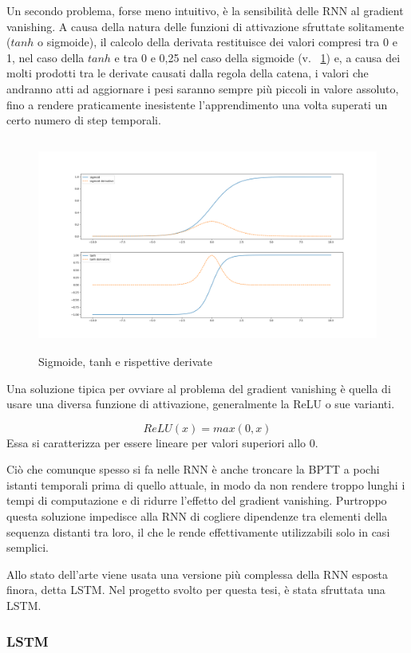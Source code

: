 Un secondo problema, forse meno intuitivo, è la sensibilità delle RNN al gradient vanishing. A causa della natura delle funzioni di attivazione sfruttate solitamente ($tanh$ o sigmoide), il calcolo della derivata restituisce dei valori compresi tra 0 e 1, nel caso della $tanh$ e tra 0 e 0,25 nel caso della sigmoide (v. \figurename~\ref{fig:sigm_tanh}) e, a causa dei molti prodotti tra le derivate causati dalla regola della catena, i valori che andranno atti ad aggiornare i pesi saranno sempre più piccoli in valore assoluto, fino a rendere praticamente inesistente l'apprendimento una volta superati un certo numero di step temporali.

\begin{figure}
    \centering
    \includegraphics[height=7cm]{pictures/sigm_tanh_deriv.png}
    \caption{Sigmoide, tanh e rispettive derivate}
    \label{fig:sigm_tanh}
\end{figure}

Una soluzione tipica per ovviare al problema del gradient vanishing è quella di usare una diversa funzione di attivazione, generalmente la ReLU o sue varianti.

\begin{equation*}
    ReLU(x) = max(0,x)
\end{equation*}
Essa si caratterizza per essere lineare per valori superiori allo 0.

Ciò che comunque spesso si fa nelle RNN è anche troncare la BPTT a pochi istanti temporali prima di quello attuale, in modo da non rendere troppo lunghi i tempi di computazione e di ridurre l'effetto del gradient vanishing. Purtroppo questa soluzione impedisce alla RNN di cogliere dipendenze tra elementi della sequenza distanti tra loro, il che le rende effettivamente utilizzabili solo in casi semplici.

Allo stato dell'arte viene usata una versione più complessa della RNN esposta finora, detta LSTM. Nel progetto svolto per questa tesi, è stata sfruttata una LSTM.

\subsubsection{LSTM}